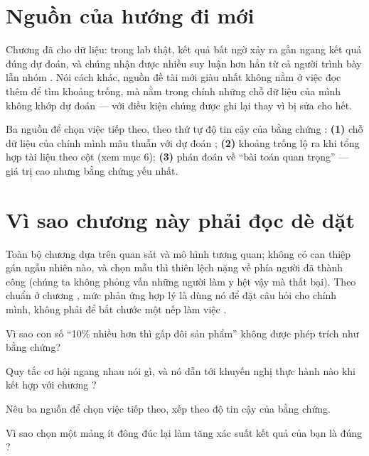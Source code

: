 \documentclass[../hieu-suat.tex]{subfiles}
\begin{document}
\section{Nguồn của hướng đi mới}

Chương  đã cho dữ liệu: trong lab thật, kết quả bất ngờ xảy ra gần ngang kết quả đúng dự đoán, và chúng nhận được nhiều suy luận hơn hẳn từ cả người trình bày lẫn nhóm \cite{dunbar1997} \nD{}. Nói cách khác, nguồn đề tài mới giàu nhất không nằm ở việc đọc thêm để tìm khoảng trống, mà nằm trong chính những chỗ dữ liệu của mình không khớp dự đoán --- với điều kiện chúng được ghi lại thay vì bị sửa cho hết.

\begin{cannho}
Ba nguồn để chọn việc tiếp theo, theo thứ tự độ tin cậy của bằng chứng \nM{}: \textbf{(1)} chỗ dữ liệu của chính mình mâu thuẫn với dự đoán \cite{dunbar1997}; \textbf{(2)} khoảng trống lộ ra khi tổng hợp tài liệu theo cột (xem  mục 6); \textbf{(3)} phán đoán về ``bài toán quan trọng'' \cite{hamming1986} --- giá trị cao nhưng bằng chứng yếu nhất.
\end{cannho}

\section{Vì sao chương này phải đọc dè dặt}

Toàn bộ chương dựa trên quan sát và mô hình tương quan; không có can thiệp gán ngẫu nhiên nào, và chọn mẫu thì thiên lệch nặng về phía người đã thành công (chúng ta không phỏng vấn những người làm y hệt vậy mà thất bại). Theo chuẩn ở chương , mức phản ứng hợp lý là dùng nó để đặt câu hỏi cho chính mình, không phải để bắt chước một nếp làm việc \nM{}.

\begin{traloi}
\end{traloi}

\begin{tukiem}
\item Vì sao con số ``10\% nhiều hơn thì gấp đôi sản phẩm'' không được phép trích như bằng chứng?
\item Quy tắc cơ hội ngang nhau nói gì, và nó dẫn tới khuyến nghị thực hành nào khi kết hợp với chương ?
\item Nêu ba nguồn để chọn việc tiếp theo, xếp theo độ tin cậy của bằng chứng.
\item Vì sao chọn một mảng ít đông đúc lại làm tăng xác suất kết quả của bạn là đúng \cite{ioannidis2005}?
\end{tukiem}
\end{document}
